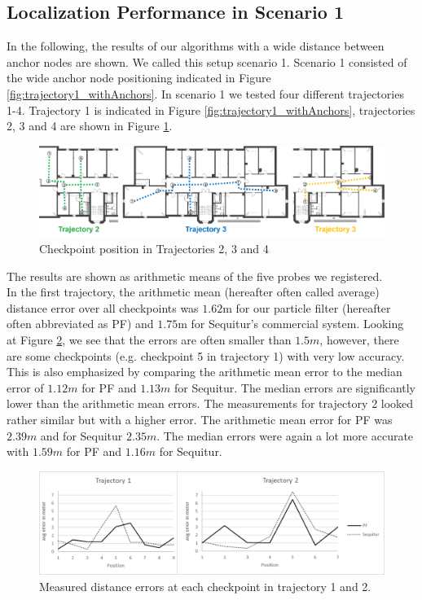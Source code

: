 \subsection{Localization Performance in Scenario 1}
In the following, the results of our algorithms with a wide distance between anchor nodes are shown. We called this setup scenario 1. Scenario 1 consisted of the wide anchor node positioning indicated in Figure \ref{fig:trajectory1_withAnchors}. In scenario 1 we tested four different trajectories 1-4. Trajectory 1 is indicated in Figure \ref{fig:trajectory1_withAnchors}, trajectories 2, 3 and 4 are shown in Figure \ref{fig:trajectories2to4}.
\begin{figure}[th]
\centering
\includegraphics[width=1.0\textwidth]{Figures/trajectories2to4}
\decoRule
\caption[Trajectories 2-4]{Checkpoint position in Trajectories 2, 3 and 4}
\label{fig:trajectories2to4}
\end{figure}
The results are shown as arithmetic means of the five probes we registered.\\
\noindent\hspace*{5mm}%
In the first trajectory, the arithmetic mean (hereafter often called average) distance error over all checkpoints was $1.62$m for our  particle filter (hereafter often abbreviated as PF) and $1.75$m for Sequitur's commercial system. Looking at Figure \ref{fig:trajectory1and2_results}, we see that the errors are often smaller than $1.5m$, however, there are some checkpoints (e.g. checkpoint 5 in trajectory 1) with very low accuracy. This is also emphasized by comparing the arithmetic mean error to the median error of $1.12m$ for PF and $1.13m$ for Sequitur. The median errors are significantly lower than the arithmetic mean errors. The measurements for trajectory 2 looked rather similar but with a higher error. The arithmetic mean error for PF was $2.39m$ and for Sequitur $2.35m$. The median errors were again a lot more accurate with $1.59m$ for PF and $1.16m$ for Sequitur.
\begin{figure}[th]
\centering
\includegraphics[width=1.0\textwidth]{Figures/trajectory1_2_results}
\decoRule
\caption[Localization Results of Trajectory 1 and 2]{Measured distance errors at each checkpoint in trajectory 1 and 2.}
\label{fig:trajectory1and2_results}
\end{figure}
